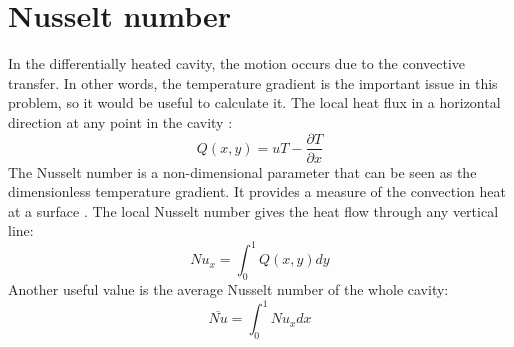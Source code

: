 \section{Nusselt number}
In the differentially heated cavity, the motion occurs due to the convective transfer. In other words, the temperature gradient is the important issue in this problem, so it would be useful to calculate it. The local heat flux in a horizontal direction at any point in the cavity \cite{DeVahlDavis1983}:
\begin{equation}
Q\left(x, y\right)=uT-\frac{\partial T}{\partial x}
\end{equation}
The Nusselt number is a non-dimensional parameter that can be seen as the dimensionless temperature gradient. It provides a measure of the convection heat at a surface \cite{Bergman2011}. The local Nusselt number gives the heat flow through any vertical line:
\begin{equation}
	Nu_{x}=\int_{0}^{1}Q\left(x, y\right)dy
\end{equation}
Another useful value is the average Nusselt number of the whole cavity:
\begin{equation}
\overbar{Nu}=\int_{0}^{1}Nu_{x}dx
\end{equation}

